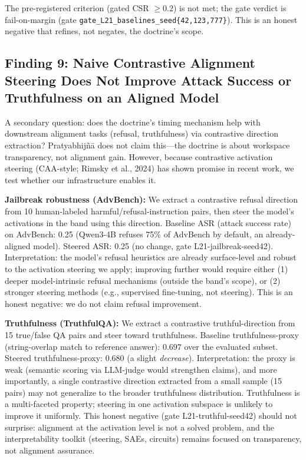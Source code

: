 The pre-registered criterion (gated CSR $\geq 0.2$) is not met; the gate verdict is fail-on-margin
(gate \texttt{gate\_L21\_baselines\_seed\{42,123,777\}}).
This is an honest negative that refines, not negates, the doctrine's scope.

\subsection*{Finding 9: Naive Contrastive Alignment Steering Does Not Improve Attack Success or Truthfulness on an Aligned Model}

A secondary question: does the doctrine's timing mechanism help with downstream alignment tasks
(refusal, truthfulness) via contrastive direction extraction? Pratyabhij\~n\=a does not claim this---the doctrine
is about workspace transparency, not alignment gain. However, because contrastive activation steering
(CAA-style; Rimsky et al., 2024) has shown promise in recent work, we test whether our infrastructure
enables it.

\textbf{Jailbreak robustness (AdvBench):} We extract a contrastive refusal direction from 10 human-labeled
harmful/refusal-instruction pairs, then steer the model's activations in the band using this direction.
Baseline ASR (attack success rate) on AdvBench: 0.25 (Qwen3-4B refuses 75\% of AdvBench by default, an
already-aligned model). Steered ASR: 0.25 (no change, gate L21-jailbreak-seed42).
Interpretation: the model's refusal heuristics are already surface-level and robust to the activation
steering we apply; improving further would require either (1) deeper model-intrinsic refusal mechanisms
(outside the band's scope), or (2) stronger steering methods (e.g., supervised fine-tuning, not steering).
This is an honest negative: we do not claim refusal improvement.

\textbf{Truthfulness (TruthfulQA):} We extract a contrastive truthful-direction from 15 true/false QA pairs
and steer toward truthfulness. Baseline truthfulness-proxy (string-overlap match to reference answer):
$0.697$ over the evaluated subset. Steered truthfulness-proxy: $0.680$ (a slight \emph{decrease}).
Interpretation: the proxy is weak (semantic scoring via LLM-judge would strengthen claims), and more
importantly, a single contrastive direction extracted from a small sample (15 pairs) may not generalize
to the broader truthfulness distribution. Truthfulness is a multi-faceted property; steering in one
activation subspace is unlikely to improve it uniformly. This honest negative (gate L21-truthful-seed42)
should not surprise: alignment at the activation level is not a solved problem, and the interpretability
toolkit (steering, SAEs, circuits) remains focused on transparency, not alignment assurance.

